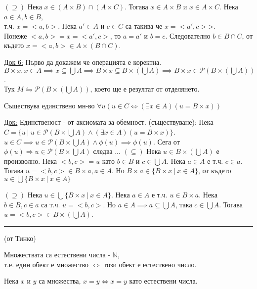 \documentclass[fleqn, titlepage, 12pt]{report}
\begin{document}
$(\supseteq)$ Нека $x \in (A \times  B) \cap (A \times C)$. Тогава $x \in A \times B$ и $x \in A \times C$. Нека
$a \in A, b \in B$,\\
т.ч. $x = <a,b>$. Нека $a' \in A $ и $ c \in C$ са такива че $x = <a',c>$>.\\
Понеже $<a,b> = x = <a',c>$, то $a = a'$ и $b = c$.
Следователно $b \in B \cap C$, от където $x = <a,b> \in A \times (B \cap C)$.
\bigbreak

\underline{Док 6:} Първо да докажем че операцията е коректна.\\
$B \times x, x \in A \implies x \subseteq \bigcup{A} \implies B \times x \subseteq B \times (\bigcup A) \implies
B \times x \in \mathcal{P}(B \times (\bigcup A)) $.\\
Тук $M \leftrightharpoons \mathcal{P}(B \times (\bigcup A))$, което ще е резултат от отделянето.
\bigbreak

 Съществува единствено мн-во $ \forall{u} (u \in C \Leftrightarrow ( \exists{x} \in A)(u = B \times x)) $
\bigbreak

\underline{Док:} Единственост - от аксиомата за обемност.
\bigbreak
(съществуване): Нека $C = \{u\ |\ u \in \mathcal{P}(B \times \bigcup A) \land ( \exists{x \in A})(u = B \times x) \}$.\\
$u \in C \implies u \in \mathcal{P}(B \times  \bigcup{A} ) \land \phi(u) \implies \phi(u)  $.
Сега от $ \phi(u) \Rightarrow u \in \mathcal{P}(B \times  \bigcup{A} )$ следва ...
\bigbreak
$( \subseteq)$ Нека $ u \in B \times ( \bigcup{A} )$ е произволно. Нека $<b,c> = u$ като $b \in B$ и $c \in \bigcup{A} $.
Нека $a \in A$ е т.ч. $c \in a$. Тогава $u = <b,c> \in B \times a, a \in A$.
Но $B \times a \in \{B \times x\ |\ x \in A\}$, от където $u \in \bigcup{ \{B \times x\ |\ x \in A\}} $
\bigbreak

$(\supseteq)$ Нека $u \in \bigcup{ \{B \times x\ |\ x \in A\}} $. Нека $a \in A$ е т.ч. $u \in B \times a$.
Нека $b \in B, c \in a$ са т.ч. $u = <b,c>$. Но $a \in A \implies a \subseteq \bigcup{A}$, така $c \in \bigcup{A} $.
Тогава $u = <b,c> \in B \times ( \bigcup{A} )$.
\bigbreak

\hrule
\bigbreak
\begin{center}
(от Тинко)
\end{center}
Множествата са естествени числа - $\mathbb{N}$,\\
т.е. един обект е множество $\Longleftrightarrow $ този обект е естествено число.
\bigbreak

Нека $ x $ и $ y $ са множества, $x = y \Longleftrightarrow x = y$ като естествени числа.
\bigbreak
\end{document}
